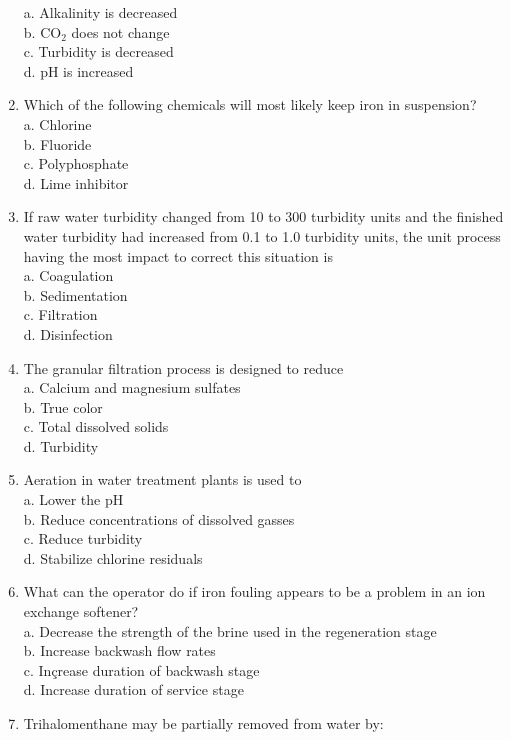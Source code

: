 \begin{enumerate}
a. Alkalinity is decreased\\
b. $\mathrm{CO}_{2}$ does not change\\
c. Turbidity is decreased\\
d. $\mathrm{pH}$ is increased\\
\item Which of the following chemicals will most likely keep iron in suspension?\\
a. Chlorine\\
b. Fluoride\\
c. Polyphosphate\\
d. Lime inhibitor\\
\item If raw water turbidity changed from 10 to 300 turbidity units and the finished water turbidity had increased from 0.1 to 1.0 turbidity units, the unit process having the most impact to correct this situation is\\
a. Coagulation\\
b. Sedimentation\\
c. Filtration\\
d. Disinfection\\
\item The granular filtration process is designed to reduce\\
a. Calcium and magnesium sulfates\\
b. True color\\
c. Total dissolved solids\\
d. Turbidity\\
\item Aeration in water treatment plants is used to\\
a. Lower the $\mathrm{pH}$\\
b. Reduce concentrations of dissolved gasses\\
c. Reduce turbidity\\
d. Stabilize chlorine residuals\\
\item What can the operator do if iron fouling appears to be a problem in an ion exchange softener?\\
a. Decrease the strength of the brine used in the regeneration stage\\
b. Increase backwash flow rates\\
c. Inçrease duration of backwash stage\\
d. Increase duration of service stage\\
\item Trihalomenthane may be partially removed from water by:\\

\end{enumerate}
